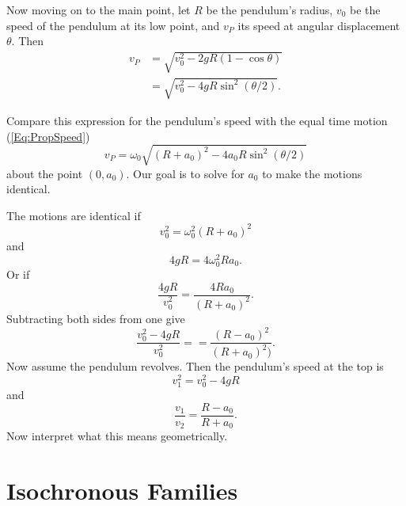 \documentclass{ximera}
\begin{document}
Now moving on to the main point, let $R$ be the pendulum's radius, $v_0$ be the speed of the pendulum at its low point, and $v_P$ its speed at angular displacement $\theta$. Then
\begin{align*}
    v_P    &= \sqrt{v_0^2 - 2gR(1-\cos\theta)}  \\
          &= \sqrt{v_0^2 - 4gR\sin^2 (\theta/2)} .
\end{align*}

Compare this expression for the pendulum's speed with the equal time motion (\ref{Eq:PropSpeed}) 
\[
    v_P  = \omega_0 \sqrt{(R+a_0)^2 - 4a_0R\sin^2(\theta/2)}
\]
about the point $(0,a_0)$. Our goal is to solve for $a_0$ to make the motions identical.

The motions are identical if
\[
     v_0^2 = \omega_0^2 (R+a_0)^2  
\]
and
\[
      4gR = 4\omega_0^2 Ra_0 .
\]
Or if
\[
    \frac{4gR}{v_0^2}    = \frac{4Ra_0}{(R+a_0)^2}      .
\]
Subtracting both sides from one give
\[
         \frac{v_0^2 - 4gR}{v_0^2} =  = \frac{(R - a_0)^2}{(R+a_0)^2)}  .
\]
Now assume the pendulum revolves. Then the pendulum's speed at the top is
\[
      v_1^2 = v_0^2 - 4gR 
\]
and
\[
    \frac{v_1}{v_2} = \frac{R-a_0}{R+a_0} .
\]
Now interpret what this means geometrically.



\section*{Isochronous Families}
\end{document}
